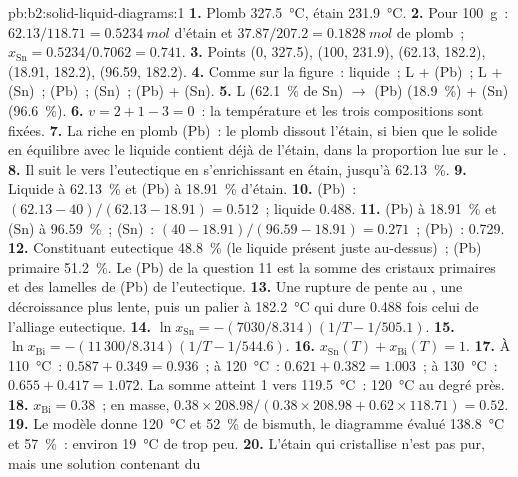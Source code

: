 \begin{solution}{pb:b2:solid-liquid-diagrams:1}
\textbf{1.} Plomb \qty{327.5}{\degreeCelsius}, étain \qty{231.9}{\degreeCelsius}.
\textbf{2.} Pour \qty{100}{g}~: $62.13/118.71 = \qty{0.5234}{mol}$ d'étain et
$37.87/207.2 = \qty{0.1828}{mol}$ de plomb~; $x_{\mathrm{Sn}} = 0.5234/0.7062 =
0.741$.
\textbf{3.} Points (0, 327.5), (100, 231.9), (62.13, 182.2), (18.91, 182.2),
(96.59, 182.2).
\textbf{4.} Comme sur la figure~: liquide~; L + (Pb)~; L + (Sn)~; (Pb)~; (Sn)~; (Pb) + (Sn).
\textbf{5.} L (62.1~\% de Sn) $\longrightarrow$ (Pb) (18.9~\%) + (Sn) (96.6~\%).
\textbf{6.} $v = 2 + 1 - 3 = 0$~: la température et les trois compositions sont
fixées.
\textbf{7.} La  riche en plomb (Pb)~: le plomb dissout l'étain, si bien que le solide en
équilibre avec le liquide contient déjà de l'étain, dans la proportion lue sur le
.
\textbf{8.} Il suit le  vers l'eutectique en s'enrichissant en étain,
jusqu'à 62.13~\%.
\textbf{9.} Liquide à 62.13~\% et (Pb) à 18.91~\% d'étain.
\textbf{10.} (Pb)~: $(62.13 - 40)/(62.13 - 18.91) = 0.512$~; liquide 0.488.
\textbf{11.} (Pb) à 18.91~\% et (Sn) à 96.59~\%~; (Sn)~: $(40 - 18.91)/(96.59 -
18.91) = 0.271$~; (Pb)~: 0.729.
\textbf{12.} Constituant eutectique 48.8~\% (le liquide présent juste au-dessus)~;
(Pb) primaire 51.2~\%. Le (Pb) de la question 11 est la somme des cristaux
primaires et des lamelles de (Pb) de l'eutectique.
\textbf{13.} Une rupture de pente au , une décroissance plus lente, puis un palier à
\qty{182.2}{\degreeCelsius} qui dure 0.488 fois celui de l'alliage eutectique.
\textbf{14.} $\ln x_{\mathrm{Sn}} = -(7030/8.314)(1/T - 1/505.1)$.
\textbf{15.} $\ln x_{\mathrm{Bi}} = -(11\,300/8.314)(1/T - 1/544.6)$.
\textbf{16.} $x_{\mathrm{Sn}}(T) + x_{\mathrm{Bi}}(T) = 1$.
\textbf{17.} À \qty{110}{\degreeCelsius}~: $0.587 + 0.349 = 0.936$~; à
\qty{120}{\degreeCelsius}~: $0.621 + 0.382 = 1.003$~; à
\qty{130}{\degreeCelsius}~: $0.655 + 0.417 = 1.072$. La somme atteint 1 vers
\qty{119.5}{\degreeCelsius}~: \qty{120}{\degreeCelsius} au degré près.
\textbf{18.} $x_{\mathrm{Bi}} = 0.38$~; en masse, $0.38 \times 208.98/(0.38 \times
208.98 + 0.62 \times 118.71) = 0.52$.
\textbf{19.} Le modèle donne \qty{120}{\degreeCelsius} et 52~\% de bismuth, le
diagramme évalué \qty{138.8}{\degreeCelsius} et 57~\%~: environ
\qty{19}{\degreeCelsius} de trop peu.
\textbf{20.} L'étain qui cristallise n'est pas pur, mais une solution contenant du

\end{solution}
